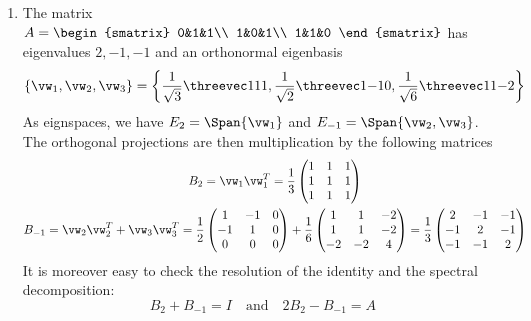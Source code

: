 \begin{examples}
\begin{enumerate}
\item The matrix $A=\begin{smatrix}
0&1&1\\
1&0&1\\
1&1&0
\end{smatrix}$ has eigenvalues $2,-1,-1$ and an orthonormal eigenbasis
\[\{\vw_1,\vw_2,\vw_3\} =\left\{\frac 1{\sqrt 3}\threevec 111, \frac 1{\sqrt 2}\threevec 1{-1}0,\frac 1{\sqrt 6}\threevec 11{-2} \right\}\]
As eignspaces, we have $E_2=\Span\{\vw_1\}$ and $E_{-1}=\Span\{\vw_2,\vw_3\}$. The orthogonal projections are then multiplication by the following matrices
\begin{gather*}
B_2=\vw_1\vw_1^T=\frac 13\begin{pmatrix}
1&1&1\\
1&1&1\\
1&1&1
\end{pmatrix}\\
B_{-1}=\vw_2\vw_2^T+\vw_3\vw_3^T
=\frac 12\begin{pmatrix}
1&-1&0\\
-1&1&0\\
0&0&0
\end{pmatrix}+\frac 16\begin{pmatrix}
1&1&-2\\
1&1&-2\\
-2&-2&4
\end{pmatrix}
=\frac 13\begin{pmatrix}
2&-1&-1\\
-1&2&-1\\
-1&-1&2
\end{pmatrix}
\end{gather*}
It is moreover easy to check the resolution of the identity and the spectral decomposition:
\[B_2+B_{-1}=I\quad\text{and}\quad 2B_2-B_{-1}=A\]
\end{enumerate}
\end{examples}



